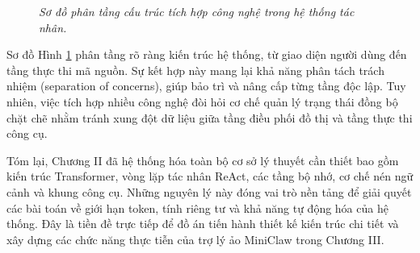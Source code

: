 \begin{figure}[H]
  \centering
  \caption[\emph{Sơ đồ phân tầng tích hợp công nghệ MiniClaw.}]{\emph{Sơ đồ phân tầng cấu trúc tích hợp công nghệ trong hệ thống tác nhân.}}
  \label{fig:technology-stack}
\end{figure}

Sơ đồ Hình \ref{fig:technology-stack} phân tầng rõ ràng kiến trúc hệ thống, từ giao diện người dùng đến tầng thực thi mã nguồn. Sự kết hợp này mang lại khả năng phân tách trách nhiệm (separation of concerns), giúp bảo trì và nâng cấp từng tầng độc lập. Tuy nhiên, việc tích hợp nhiều công nghệ đòi hỏi cơ chế quản lý trạng thái đồng bộ chặt chẽ nhằm tránh xung đột dữ liệu giữa tầng điều phối đồ thị và tầng thực thi công cụ.

Tóm lại, Chương II đã hệ thống hóa toàn bộ cơ sở lý thuyết cần thiết bao gồm kiến trúc Transformer, vòng lặp tác nhân ReAct, các tầng bộ nhớ, cơ chế nén ngữ cảnh và khung công cụ. Những nguyên lý này đóng vai trò nền tảng để giải quyết các bài toán về giới hạn token, tính riêng tư và khả năng tự động hóa của hệ thống. Đây là tiền đề trực tiếp để đồ án tiến hành thiết kế kiến trúc chi tiết và xây dựng các chức năng thực tiễn của trợ lý ảo MiniClaw trong Chương III.
